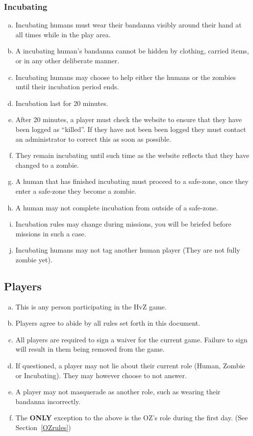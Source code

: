 \documentclass[a4paper,12pt]{article}
\begin{document}
\subsubsection{Incubating}
\label{Incubating}
\begin{enumerate}[(a)]
    \item Incubating humans must wear their bandanna visibly around their hand at all times while in the play area.
    \item A incubating human's bandanna cannot be hidden by clothing, carried items, or in any other deliberate manner.
    \item Incubating humans may choose to help either the humans or the zombies until their incubation period ends.
    \item Incubation last for 20 minutes.
    \item After 20 minutes, a player must check the website to ensure that they have been logged as ``killed''. If they have not been been logged they must contact an administrator to correct this as soon as possible.
    \item They remain incubating until such time as the website reflects that they have changed to a zombie.
    \item A human that has finished incubating must proceed to a safe-zone, once they enter a safe-zone they become a zombie.
    \item A human may not complete incubation from outside of a safe-zone.
    \item Incubation rules may change during missions, you will be briefed before missions in such a case.
    \item Incubating humans may not tag another human player (They are not fully zombie yet).
\end{enumerate}



\subsection{Players}

\begin{enumerate}[(a)]
    \item This is any person participating in the HvZ game.
    \item Players agree to abide by all rules set forth in this document.
    \item All players are required to sign a waiver for the current game. Failure to sign will result in them being removed from the game. 
    \item If questioned, a player may not lie about their current role (Human, Zombie or Incubating). They may however choose to not answer. 
    \item A player may not masquerade as another role, such as wearing their bandanna incorrectly.
    \item The {\bf ONLY} exception to the above is the OZ's role during the first day. (See Section~\ref{OZrules})
\end{enumerate}
\end{document}
